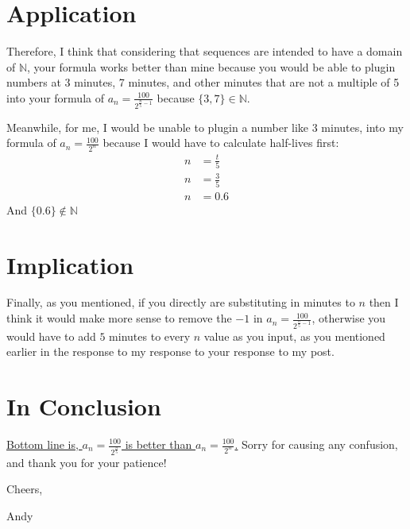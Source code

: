 \documentclass[12pt]{article}
\begin{document}
\section{Application}
Therefore, I think that considering that sequences are intended to have a domain of $\mathbb{N}$, your formula works better than mine because you would be able to plugin numbers at 3 minutes, 7 minutes, and other minutes that are not a multiple of 5 into your formula of $a_{n}=\frac{100}{2^{\frac{n}{5}-1}}$ because $\{3,7\}\in\mathbb{N}$. 

Meanwhile, for me, I would be unable to plugin a number like 3 minutes, into my formula of $a_{n}=\frac{100}{2^{n}}$ because I would have to calculate half-lives first:
\begin{align}
n&=\frac{t}{5}\\
n&=\frac{3}{5}\\
n&=0.6
\end{align}
And $\{0.6\}\not\in\mathbb{N}$ 

\section{Implication}
Finally, as you mentioned, if you directly are substituting in minutes to $n$ then I think it would make more sense to remove the $-1$ in $a_{n}=\frac{100}{2^{\frac{n}{5}-1}}$, otherwise you would have to add $5$ minutes to every $n$ value as you input, as you mentioned earlier in the response to my response to your response to my post.

\section{In Conclusion}
\underline{Bottom line is, $a_{n}=\frac{100}{2^{\frac{n}{5}}}$ is better than $a_{n}=\frac{100}{2^{n}}$.}
Sorry for causing any confusion, and thank you for your patience!

Cheers, 

Andy
\end{document}
